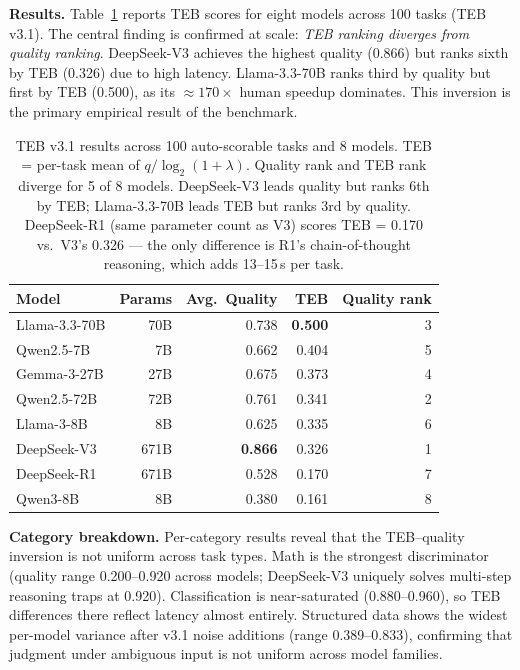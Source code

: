 \documentclass[12pt]{article}
\begin{document}
\textbf{Results.} Table~\ref{tab:teb-results} reports TEB scores for eight models across 100 tasks (TEB v3.1). The central finding is confirmed at scale: \textit{TEB ranking diverges from quality ranking}. DeepSeek-V3 achieves the highest quality (0.866) but ranks sixth by TEB (0.326) due to high latency. Llama-3.3-70B ranks third by quality but first by TEB (0.500), as its ${\approx}170\times$ human speedup dominates. This inversion is the primary empirical result of the benchmark.

\begin{table}[H]
\centering
\small
\begin{tabular}{lrrrr}
\toprule
\textbf{Model} & \textbf{Params} & \textbf{Avg.\ Quality} & \textbf{TEB} & \textbf{Quality rank} \\
\midrule
Llama-3.3-70B  & 70B  & 0.738 & \textbf{0.500} & 3 \\
Qwen2.5-7B     & 7B   & 0.662 & 0.404 & 5 \\
Gemma-3-27B    & 27B  & 0.675 & 0.373 & 4 \\
Qwen2.5-72B    & 72B  & 0.761 & 0.341 & 2 \\
Llama-3-8B     & 8B   & 0.625 & 0.335 & 6 \\
DeepSeek-V3    & 671B & \textbf{0.866} & 0.326 & 1 \\
DeepSeek-R1    & 671B & 0.528 & 0.170 & 7 \\
Qwen3-8B       & 8B   & 0.380 & 0.161 & 8 \\
\bottomrule
\end{tabular}
\caption{TEB v3.1 results across 100 auto-scorable tasks and 8 models. TEB = per-task mean of $q/\log_2(1{+}\lambda)$. Quality rank and TEB rank diverge for 5 of 8 models. DeepSeek-V3 leads quality but ranks 6th by TEB; Llama-3.3-70B leads TEB but ranks 3rd by quality. DeepSeek-R1 (same parameter count as V3) scores TEB = 0.170 vs.\ V3's 0.326 --- the only difference is R1's chain-of-thought reasoning, which adds 13--15\,s per task.}
\label{tab:teb-results}
\end{table}

\textbf{Category breakdown.} Per-category results reveal that the TEB--quality inversion is not uniform across task types. Math is the strongest discriminator (quality range 0.200--0.920 across models; DeepSeek-V3 uniquely solves multi-step reasoning traps at 0.920). Classification is near-saturated (0.880--0.960), so TEB differences there reflect latency almost entirely. Structured data shows the widest per-model variance after v3.1 noise additions (range 0.389--0.833), confirming that judgment under ambiguous input is not uniform across model families.
\end{document}
